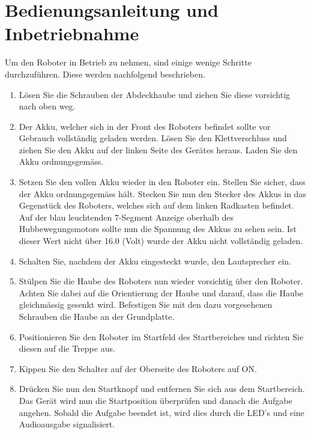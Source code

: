 \newpage

\section{Bedienungsanleitung und Inbetriebnahme}

Um den Roboter in Betrieb zu nehmen, sind einige wenige Schritte durchzuführen. Diese werden nachfolgend beschrieben.\\

\begin{enumerate}
    \item Lösen Sie die Schrauben der Abdeckhaube und ziehen Sie diese vorsichtig nach oben weg.
    \item Der Akku, welcher sich in der Front des Roboters befindet sollte vor Gebrauch vollständig geladen werden. Lösen Sie den Klettverschluss und ziehen Sie den Akku auf der linken Seite des Gerätes heraus. Laden Sie den Akku ordnungsgemäss.
    \item Setzen Sie den vollen Akku wieder in den Roboter ein. Stellen Sie sicher, dass der Akku ordnungsgemäss hält. Stecken Sie nun den Stecker des Akkus in das Gegenstück des Roboters, welches sich auf dem linken Radkasten befindet. Auf der blau leuchtenden 7-Segment Anzeige oberhalb des Hubbewegungsmotors sollte nun die Spannung des Akkus zu sehen sein. Ist dieser Wert nicht über 16.0 (Volt) wurde der Akku nicht vollständig geladen.
    \item Schalten Sie, nachdem der Akku eingesteckt wurde, den Lautsprecher ein.
    \item Stülpen Sie die Haube des Roboters nun wieder vorsichtig über den Roboter. Achten Sie dabei auf die Orientierung der Haube und darauf, dass die Haube gleichmässig gesenkt wird. Befestigen Sie mit den dazu vorgesehenen Schrauben die Haube an der Grundplatte.
    \item Positionieren Sie den Roboter im Startfeld des Startbereiches und richten Sie diesen auf die Treppe aus.
    \item Kippen Sie den Schalter auf der Oberseite des Roboters auf \glqq ON\grqq{}.
    \item Drücken Sie nun den Startknopf und entfernen Sie sich aus dem Startbereich. Das Gerät wird nun die Startposition überprüfen und danach die Aufgabe angehen. Sobald die Aufgabe beendet ist, wird dies durch die LED's und eine Audioausgabe signalisiert.
\end{enumerate}

\newpage

